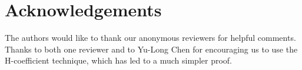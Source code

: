 \documentclass[eprint.tex]{subfiles}
\begin{document}
\section{Acknowledgements}
The authors would like to thank our anonymous reviewers for helpful comments.
Thanks to both
one reviewer and to Yu-Long Chen for encouraging us to use the
H-coefficient technique, which has led to a much simpler proof.

\subbib
\end{document}

